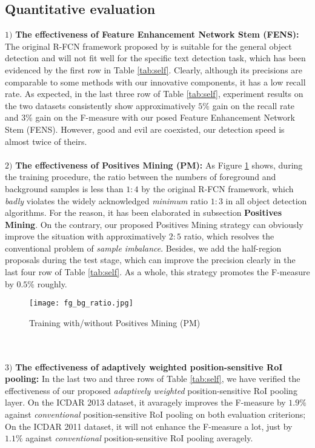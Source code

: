 \documentclass[letterpaper]{article}
\begin{document}
\subsection{Quantitative evaluation}
$1)$ \textbf{The effectiveness of Feature Enhancement Network Stem (FENS):} The original R-FCN framework proposed by \cite{dai2016r} is suitable for the general object detection and will not fit well for the specific text detection task, which has been evidenced by the first row in Table \ref{tab:self}. Clearly, although its precisions are comparable to some methods with our innovative components, it has a low recall rate. As expected, in the last three row of Table \ref{tab:self}, experiment results on the two datasets consistently show approximatively $5\%$ gain on the recall rate and $3\%$ gain on the F-measure with our posed Feature Enhancement Network Stem (FENS). However, good and evil are coexisted, our detection speed is almost twice of theirs.\\
\\
$2)$ \textbf{The effectiveness of Positives Mining (PM):} As Figure \ref{fig:pm} shows, during the training procedure, the ratio between the numbers of foreground and background samples is less than $1:4$ by the original R-FCN framework, which \textit{badly} violates the widely acknowledged \textit{minimum} ratio $1:3$ in all object detection algorithms. For the reason, it has been elaborated in subsection \textbf{Positives Mining}. On the contrary, our proposed Positives Mining strategy can obviously improve the situation with approximatively $2:5$ ratio, which resolves the conventional problem of \textit{sample imbalance}. Besides, we add the half-region proposals \cite{gidaris2015object} during the test stage, which can improve the precision clearly in the last four row of Table \ref{tab:self}. As a whole, this strategy promotes the F-measure by $0.5\%$ roughly.
\begin{figure}[!htb]
\begin{center}
\texttt{[image: fg\_bg\_ratio.jpg]}
\caption{Training with/without Positives Mining (PM)}\label{fig:pm}
\end{center}
\end{figure}
\\
\\
$3)$ \textbf{The effectiveness of adaptively weighted position-sensitive RoI pooling:} In the last two and three rows of Table \ref{tab:self}, we have verified the effectiveness of our proposed \textit{adaptively weighted} position-sensitive RoI pooling layer. On the ICDAR 2013 dataset, it avaragely improves the F-measure by $1.9\%$ against \textit{conventional} position-sensitive RoI pooling on both evaluation criterions; On the ICDAR 2011 dataset, it will not enhance the F-measure a lot, just by $1.1\%$ against \textit{conventional} position-sensitive RoI pooling averagely.\\
\end{document}
